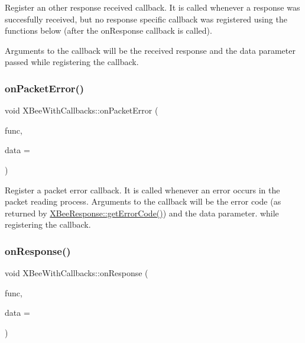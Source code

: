Register an other response received callback. It is called whenever a response was succesfully received, but no response specific callback was registered using the functions below (after the on\+Response callback is called).

Arguments to the callback will be the received response and the data parameter passed while registering the callback. \hypertarget{class_x_bee_with_callbacks_ad0e1a60d761641e8bd0349a615522b55}{}\label{class_x_bee_with_callbacks_ad0e1a60d761641e8bd0349a615522b55} 
\subsubsection{\texorpdfstring{on\+Packet\+Error()}{onPacketError()}}
{\footnotesize\ttfamily void X\+Bee\+With\+Callbacks\+::on\+Packet\+Error (\begin{DoxyParamCaption}\item[{void($\ast$)(uint8\+\_\+t, uintptr\+\_\+t)}]{func,  }\item[{uintptr\+\_\+t}]{data = {} }\end{DoxyParamCaption})\hspace{0.3cm}{\ttfamily [inline]}}

Register a packet error callback. It is called whenever an error occurs in the packet reading process. Arguments to the callback will be the error code (as returned by \hyperlink{class_x_bee_response_a2895438378d2738e3efe74b1c838170b}{X\+Bee\+Response\+::get\+Error\+Code()}) and the data parameter. while registering the callback. \hypertarget{class_x_bee_with_callbacks_ae1044a0b7dcde294bc8bc7d2ef9f68b1}{}\label{class_x_bee_with_callbacks_ae1044a0b7dcde294bc8bc7d2ef9f68b1} 
\subsubsection{\texorpdfstring{on\+Response()}{onResponse()}}
{\footnotesize\ttfamily void X\+Bee\+With\+Callbacks\+::on\+Response (\begin{DoxyParamCaption}\item[{void($\ast$)(\hyperlink{class_x_bee_response}{X\+Bee\+Response} \&, uintptr\+\_\+t)}]{func,  }\item[{uintptr\+\_\+t}]{data = {} }\end{DoxyParamCaption})\hspace{0.3cm}{\ttfamily [inline]}}

